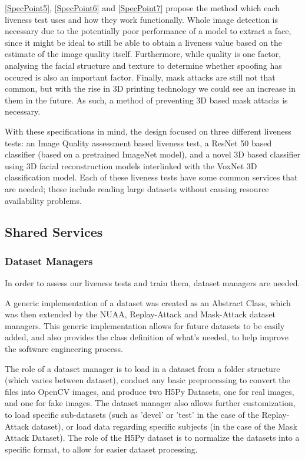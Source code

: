 \documentclass[10pt,a4paper]{article}
\begin{document}
        \ref{SpecPoint5}, \ref{SpecPoint6} and \ref{SpecPoint7} propose the method which each liveness test uses and how they work functionally. Whole image detection is necessary due to the potentially poor performance of a model to extract a face,
        since it might be ideal to still be able to obtain a liveness value based on the estimate of the image quality itself. Furthermore, while quality is one factor, analysing the facial structure and texture to determine whether spoofing has occured
        is also an important factor. Finally, mask attacks are still not that common, but with the rise in 3D printing technology we could see an increase in them in the future. As such, a method of preventing 3D based mask attacks is necessary.


        With these specifications in mind, the design focused on three different liveness tests: an Image Quality assessment based liveness test, a ResNet 50 based classifier (based on a pretrained ImageNet model),
        and a novel 3D based classifier using 3D facial reconstruction models interlinked with the VoxNet 3D classification model. Each of these liveness tests have some common services that are needed; these include
        reading large datasets without causing resource availability problems.


    \subsection{Shared Services}
        \subsubsection{Dataset Managers}
        In order to assess our liveness tests and train them, dataset managers are needed.

        A generic implementation of a dataset was created as an Abstract Class, which was then extended by the NUAA, Replay-Attack and Mask-Attack dataset managers.
        This generic implementation allows for future datasets to be easily added, and also provides the class definition of what's needed, to help improve the software engineering process.

        The role of a dataset manager is to load in a dataset from a folder structure (which varies between dataset), conduct any basic preprocessing to convert the files into OpenCV images,
        and produce two H5Py Datasets, one for real images, and one for fake images. The dataset manager also allows further customization, to load specific sub-datasets (such as 'devel' or 'test' in the case
        of the Replay-Attack dataset), or load data regarding specific subjects (in the case of the Mask Attack Dataset). The role of the H5Py dataset is to normalize the datasets into a specific format,
        to allow for easier dataset processing.
\end{document}
